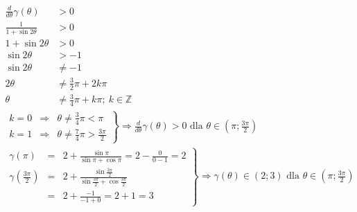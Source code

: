         \begin{align*}
        	\frac{d}{d\theta}\gamma\left( \theta\right)& > 0& \hspace{10cm}\\
        	\frac{
        		1
        	}{
        		1 + \sin 2\theta
        	} & > 0\\
        	1 + \sin 2\theta & > 0\\
        	 \sin 2\theta & > -1\\
        	 \sin 2\theta & \neq -1\\
        	 2\theta & \neq \frac{3}{2}\pi + 2k\pi\\
        	 \theta & \neq \frac{3}{4}\pi + k\pi ; \ k \in \mathbb{Z}
        \end{align*}\alignspace
       	\begin{align*}
       		\left. \begin{array}{rcl}
       		 k = 0 & \Rightarrow & \theta \neq \frac{3}{4}\pi < \pi  \\
    	 	 k = 1 & \Rightarrow &\theta \neq \frac{7}{4}\pi > \frac{3\pi}{2}
    	 	\end{array}    \right\}\Rightarrow \frac{d}{d\theta}\gamma\left( \theta\right) > 0 \text{ dla } \theta \in \left( \pi;\frac{3\pi}{2}\right)& \hspace{10cm}
        \end{align*}\alignspace
       	\begin{align*}
       	\left. \begin{array}{rcl}
       		\gamma\left( \pi\right) & = &
       		 2 + \frac{\sin \pi}{\sin \pi + \cos \pi } 
       		 =2 - \frac{0}{0 - 1} = 2\\	
       		\gamma\left( \frac{3\pi}{2}\right) & = &
       		2 + \frac{\sin  \frac{3\pi}{2}}{\sin  \frac{3\pi}{2} + \cos \frac{3\pi}{2}}\\
       		& = & 2 + \frac{-1}{-1 + 0}= 2 + 1 = 3
       	\end{array} \right\} \Rightarrow \gamma\left( \theta\right) \in \left( 2;3\right) \text{ dla } \theta \in \left( \pi;\frac{3\pi}{2}\right)& \hspace{10cm}
        \end{align*}
